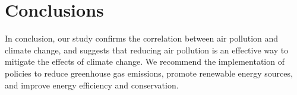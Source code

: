 \documentclass[12pt]{article}
\begin{document}
\section{Conclusions}
\label{sec:conclusions}
In conclusion, our study confirms the correlation between air pollution and climate change, and suggests that reducing air pollution is an effective way to mitigate the effects of climate change. We recommend the implementation of policies to reduce greenhouse gas emissions, promote renewable energy sources, and improve energy efficiency and conservation. 



\end{document}
